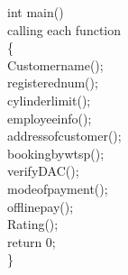 \documentclass{article}
\begin{document}
{int main()\\
	calling each function\\
\{\\
		Customername();\\
		registerednum();\\
      	cylinderlimit();\\
 	    employeeinfo();\\
		addressofcustomer();\\
	    bookingbywtsp();\\
	    verifyDAC();\\
        modeofpayment();\\
        offlinepay();\\
     	Rating();\\
     	return 0;\\
\}\\
\\
\\
\\
}
\end{document}
